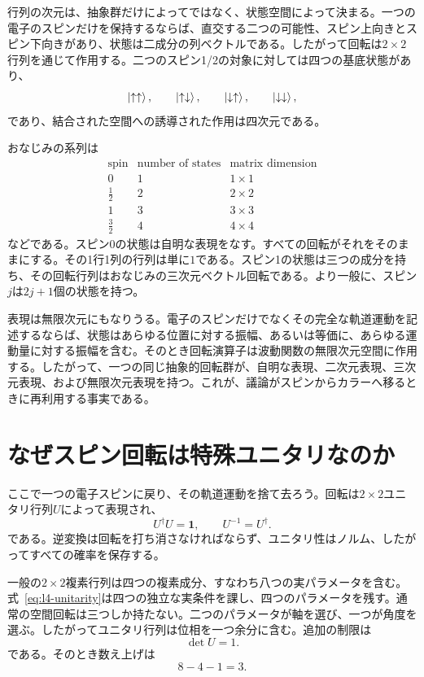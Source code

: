 行列の次元は、抽象群だけによってではなく、状態空間によって決まる。一つの電子のスピンだけを保持するならば、直交する二つの可能性、スピン上向きとスピン下向きがあり、状態は二成分の列ベクトルである。したがって回転は\(2\times2\)行列を通じて作用する。二つのスピン1/2の対象に対しては四つの基底状態があり、
\begin{equation}
\left\lvert\uparrow\uparrow\right\rangle,\qquad
\left\lvert\uparrow\downarrow\right\rangle,\qquad
\left\lvert\downarrow\uparrow\right\rangle,\qquad
\left\lvert\downarrow\downarrow\right\rangle,
\end{equation}
であり、結合された空間への誘導された作用は四次元である。

おなじみの系列は
\begin{equation}
\begin{array}{c|c|c}
\text{spin} & \text{number of states} & \text{matrix dimension}\\
\hline
0 & 1 & 1\times1\\
\frac12 & 2 & 2\times2\\
1 & 3 & 3\times3\\
\frac32 & 4 & 4\times4
\end{array}
\end{equation}
などである。スピン0の状態は自明な表現をなす。すべての回転がそれをそのままにする。その1行1列の行列は単に\(1\)である。スピン1の状態は三つの成分を持ち、その回転行列はおなじみの三次元ベクトル回転である。より一般に、スピン\(j\)は\(2j+1\)個の状態を持つ。

表現は無限次元にもなりうる。電子のスピンだけでなくその完全な軌道運動を記述するならば、状態はあらゆる位置に対する振幅、あるいは等価に、あらゆる運動量に対する振幅を含む。そのとき回転演算子は波動関数の無限次元空間に作用する。したがって、一つの同じ抽象的回転群が、自明な表現、二次元表現、三次元表現、および無限次元表現を持つ。これが、議論がスピンからカラーへ移るときに再利用する事実である。

\section{なぜスピン回転は特殊ユニタリなのか}

ここで一つの電子スピンに戻り、その軌道運動を捨て去ろう。回転は\(2\times2\)ユニタリ行列\(U\)によって表現され、
\begin{equation}
U^\dagger U=\boldsymbol 1,
\qquad
U^{-1}=U^\dagger.
\label{eq:l4-unitarity}
\end{equation}
である。逆変換は回転を打ち消さなければならず、ユニタリ性はノルム、したがってすべての確率を保存する。

一般の\(2\times2\)複素行列は四つの複素成分、すなわち八つの実パラメータを含む。式~\eqref{eq:l4-unitarity}は四つの独立な実条件を課し、四つのパラメータを残す。通常の空間回転は三つしか持たない。二つのパラメータが軸を選び、一つが角度を選ぶ。したがってユニタリ行列は位相を一つ余分に含む。追加の制限は
\begin{equation}
\det U=1.
\label{eq:l4-det-one}
\end{equation}
である。そのとき数え上げは
\begin{equation}
8-4-1=3.
\end{equation}

